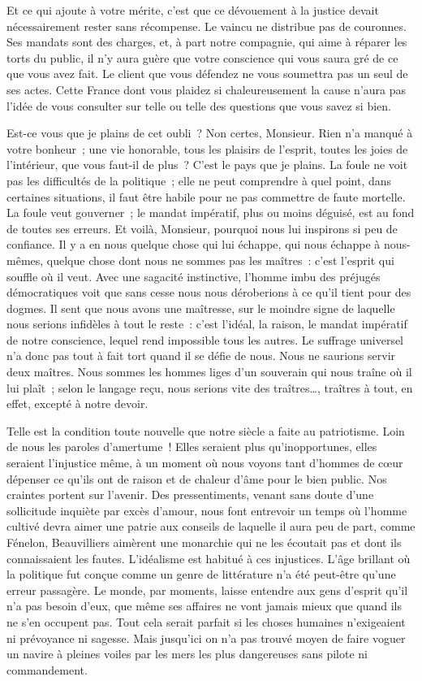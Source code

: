 \documentclass[french,twoside]{book} %
\newcommand\persName[1]{#1}
\begin{document}
Et ce qui ajoute à votre mérite, c’est que ce dévouement à la justice devait nécessairement rester sans récompense. Le vaincu ne distribue pas de couronnes. Ses mandats sont des charges, et, à part notre compagnie, qui aime à réparer les torts du public, il n’y aura guère que votre conscience qui vous saura gré de ce que vous avez fait. Le client que vous défendez ne vous soumettra pas un seul de ses actes. Cette France dont vous plaidez si chaleureusement la cause n’aura pas l’idée de vous consulter sur telle ou telle des questions que vous savez si bien.\par
Est-ce vous que je plains de cet oubli ? Non certes, Monsieur. Rien n’a manqué à votre bonheur ; une vie honorable, tous les plaisirs de l’esprit, toutes les joies de l’intérieur, que vous faut-il de plus ? C’est le pays que je plains. La foule ne voit pas les difficultés de la politique ; elle ne peut comprendre à quel point, dans certaines situations, il faut être habile pour ne pas commettre de faute mortelle. La foule veut gouverner ; le mandat impératif, plus ou moins déguisé, est au fond de toutes ses erreurs. Et voilà, Monsieur, pourquoi nous lui inspirons si peu de confiance. Il y a en nous quelque chose qui lui échappe, qui nous échappe à nous-mêmes, quelque chose dont nous ne sommes pas les maîtres : c’est l’esprit qui souffle où il veut. Avec une sagacité instinctive, l’homme imbu des préjugés démocratiques voit que sans cesse nous nous déroberions à ce qu’il tient pour des dogmes. Il sent que nous avons une maîtresse, sur le moindre signe de laquelle nous serions infidèles à tout le reste : c’est l’idéal, la raison, le mandat impératif de notre conscience, lequel rend impossible tous les autres. Le suffrage universel n’a donc pas tout à fait tort quand il se défie de nous. Nous ne saurions servir deux maîtres. Nous sommes les hommes liges d’un souverain qui nous traîne où il lui plaît ; selon le langage reçu, nous serions vite des traîtres…, traîtres à tout, en effet, excepté à notre devoir.\par
Telle est la condition toute nouvelle que notre siècle a faite au patriotisme. Loin de nous les paroles d’amertume ! Elles seraient plus qu’inopportunes, elles seraient l’injustice même, à un moment où nous voyons tant d’hommes de cœur dépenser ce qu’ils ont de raison et de chaleur d’âme pour le bien public. Nos craintes portent sur l’avenir. Des pressentiments, venant sans doute d’une sollicitude inquiète par excès d’amour, nous font entrevoir un temps où l’homme cultivé devra aimer une patrie aux conseils de laquelle il aura peu de part, comme {\persName Fénelon}, {\persName Beauvilliers} aimèrent une monarchie qui ne les écoutait pas et dont ils connaissaient les fautes. L’idéalisme est habitué à ces injustices. L’âge brillant où la politique fut conçue comme un genre de littérature n’a été peut-être qu’une erreur passagère. Le monde, par moments, laisse entendre aux gens d’esprit qu’il n’a pas besoin d’eux, que même ses affaires ne vont jamais mieux que quand ils ne s’en occupent pas. Tout cela serait parfait si les choses humaines n’exigeaient ni prévoyance ni sagesse. Mais jusqu’ici on n’a pas trouvé moyen de faire voguer un navire à pleines voiles par les mers les plus dangereuses sans pilote ni commandement.\par
\end{document}
